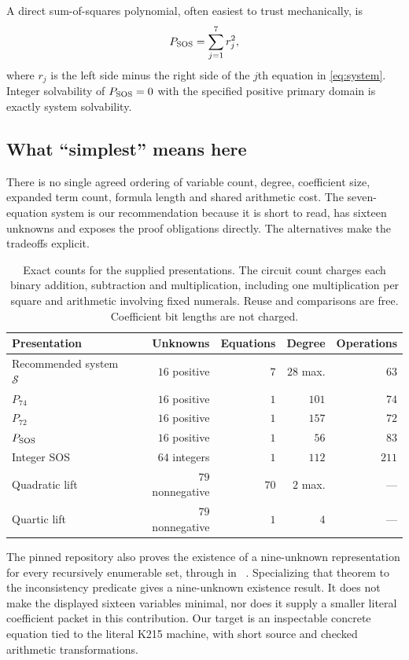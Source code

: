 \documentclass[11pt,a4paper]{article}
\theoremstyle{definition}\newtheorem{definition}[theorem]{Definition}
\newcommand{\file}[1]{\texttt{\detokenize{#1}}}
\begin{document}
A direct sum-of-squares polynomial, often easiest to trust mechanically, is
\begin{equation}\label{eq:sos}
 P_{\rm SOS}=\sum_{j=1}^7 r_j^2,
\end{equation}
where $r_j$ is the left side minus the right side of the $j$th equation
in \eqref{eq:system}. Integer solvability of $P_{\rm SOS}=0$ with the
specified positive primary domain is exactly system solvability.

\subsection{What ``simplest'' means here}
There is no single agreed ordering of variable count, degree, coefficient
size, expanded term count, formula length and shared arithmetic cost.
The seven-equation system is our recommendation because it is short to
read, has sixteen unknowns and exposes the proof obligations directly.
The alternatives make the tradeoffs explicit.

\begin{table}[ht]
\centering\small
\begin{tabular}{@{}lrrrr@{}}
\toprule
Presentation & Unknowns & Equations & Degree & Operations\\
\midrule
Recommended system $\mathcal S$ & $16$ positive & $7$ & $28$ max. & $63$\\
$P_{74}$ & $16$ positive & $1$ & $101$ & $74$\\
$P_{72}$ & $16$ positive & $1$ & $157$ & $72$\\
$P_{\rm SOS}$ & $16$ positive & $1$ & $56$ & $83$\\
Integer SOS & $64$ integers & $1$ & $112$ & $211$\\
Quadratic lift & $79$ nonnegative & $70$ & $2$ max. & ---\\
Quartic lift & $79$ nonnegative & $1$ & $4$ & ---\\
\bottomrule
\end{tabular}
\caption{Exact counts for the supplied presentations. The circuit count
charges each binary addition, subtraction and multiplication, including
one multiplication per square and arithmetic involving fixed numerals.
Reuse and comparisons are free. Coefficient bit lengths are not charged.}
\label{tab:tradeoffs}
\end{table}

The pinned repository also proves the existence of a nine-unknown
representation for every recursively enumerable set, through
\file{Jones1982.nine_unknowns} in \file{NineMain.lean}~\cite{nine}.
Specializing that theorem to the inconsistency predicate gives a
nine-unknown existence result. It does not make the displayed sixteen
variables minimal, nor does it supply a smaller literal coefficient
packet in this contribution. Our target is an inspectable concrete
equation tied to the literal K215 machine, with short source and checked
arithmetic transformations.
\end{document}
